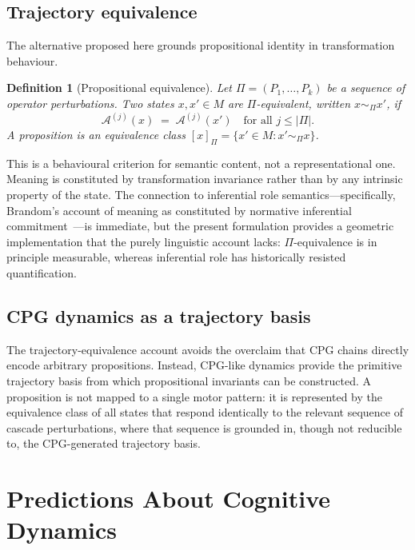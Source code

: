 \documentclass[12pt, a4paper]{article}
\newtheorem{definition}[theorem]{Definition}
\theoremstyle{remark}
\theoremstyle{definition}
\newcommand{\A}{\mathcal{A}}
\begin{document}
\subsection{Trajectory equivalence}

The alternative proposed here grounds propositional identity in transformation behaviour.

\begin{definition}[Propositional equivalence]
\label{def:equiv}
Let $\Pi = (P_1, \ldots, P_k)$ be a sequence of operator perturbations.  Two states
$x, x' \in M$ are \emph{$\Pi$-equivalent}, written $x \sim_\Pi x'$, if
\[
  \A^{(j)}(x) \;=\; \A^{(j)}(x') \quad \text{for all } j \le |\Pi|.
\]
A \emph{proposition} is an equivalence class $[x]_\Pi = \{x' \in M : x' \sim_\Pi x\}$.
\end{definition}

This is a behavioural criterion for semantic content, not a representational one.  Meaning
is constituted by transformation invariance rather than by any intrinsic property of the
state.  The connection to inferential role semantics---specifically, Brandom's account of
meaning as constituted by normative inferential commitment~\cite{brandom1994making}---is immediate, but the present
formulation provides a geometric implementation that the purely linguistic account lacks:
$\Pi$-equivalence is in principle measurable, whereas inferential role has historically
resisted quantification.

\subsection{CPG dynamics as a trajectory basis}

The trajectory-equivalence account avoids the overclaim that CPG chains directly encode
arbitrary propositions.  Instead, CPG-like dynamics provide the primitive trajectory basis
from which propositional invariants can be constructed.  A proposition is not mapped to a
single motor pattern: it is represented by the equivalence class of all states that respond
identically to the relevant sequence of cascade perturbations, where that sequence is
grounded in, though not reducible to, the CPG-generated trajectory basis.

\section{Predictions About Cognitive Dynamics}
\label{sec:predictions}
\end{document}

